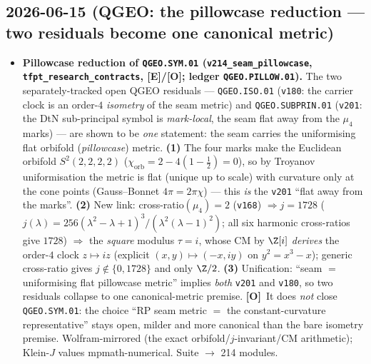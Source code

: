 \documentclass[11pt]{article}
\providecommand{\mE}{\textbf{[E]}}\providecommand{\mC}{\textbf{[C]}}
\providecommand{\mO}{\textbf{[O]}}\providecommand{\mX}{\textbf{[X]}}
\begin{document}
\subsection*{2026-06-15 (QGEO: the pillowcase reduction --- two residuals become one canonical metric)}
\begin{itemize}
\item \textbf{Pillowcase reduction of \texttt{QGEO.SYM.01} (\texttt{v214\_seam\_pillowcase},
  \texttt{tfpt\_research\_contracts}, \mE/\mO; ledger \texttt{QGEO.PILLOW.01}).} The two separately-tracked
  open QGEO residuals --- \texttt{QGEO.ISO.01} (\texttt{v180}: the carrier clock is an order-$4$
  \emph{isometry} of the seam metric) and \texttt{QGEO.SUBPRIN.01} (\texttt{v201}: the DtN sub-principal
  symbol is \emph{mark-local}, the seam flat away from the $\mu_4$ marks) --- are shown to be \emph{one}
  statement: the seam carries the uniformising flat orbifold (\emph{pillowcase}) metric. \textbf{(1)} The
  four marks make the Euclidean orbifold $S^2(2,2,2,2)$ ($\chi_{\mathrm{orb}}=2-4(1-\tfrac12)=0$), so by
  Troyanov uniformisation the metric is flat (unique up to scale) with curvature only at the cone points
  (Gauss--Bonnet $4\pi=2\pi\chi$) --- this \emph{is} the \texttt{v201} ``flat away from the marks''.
  \textbf{(2)} New link: cross-ratio$(\mu_4)=2$ (\texttt{v168}) $\Rightarrow j=1728$
  ($j(\lambda)=256(\lambda^2-\lambda+1)^3/(\lambda^2(\lambda-1)^2)$; all six harmonic cross-ratios give
  $1728$) $\Rightarrow$ the \emph{square} modulus $\tau=i$, whose CM by $\Z[i]$ \emph{derives} the order-$4$
  clock $z\mapsto iz$ (explicit $(x,y)\mapsto(-x,iy)$ on $y^2=x^3-x$); generic cross-ratio gives
  $j\notin\{0,1728\}$ and only $\Z/2$. \textbf{(3)} Unification: ``seam $=$ uniformising flat pillowcase
  metric'' implies \emph{both} \texttt{v201} and \texttt{v180}, so two residuals collapse to one
  canonical-metric premise. \mO\ It does \emph{not} close \texttt{QGEO.SYM.01}: the choice ``RP seam metric
  $=$ the constant-curvature representative'' stays open, milder and more canonical than the bare isometry
  premise. Wolfram-mirrored (the exact orbifold/$j$-invariant/CM arithmetic); Klein-$J$ values
  mpmath-numerical. Suite $\to$ 214 modules.
\end{itemize}
\end{document}
